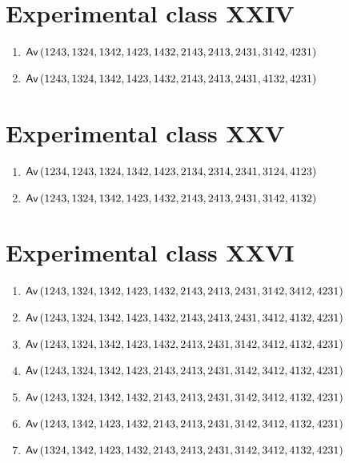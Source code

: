 \section{Experimental class XXIV}
\begin{enumerate}
\item $\textsf{Av}\left(1243,1324,1342,1423,1432,2143,2413,2431,3142,4231\right)$
\item $\textsf{Av}\left(1243,1324,1342,1423,1432,2143,2413,2431,4132,4231\right)$
\end{enumerate}

\section{Experimental class XXV}
\begin{enumerate}
\item $\textsf{Av}\left(1234,1243,1324,1342,1423,2134,2314,2341,3124,4123\right)$
\item $\textsf{Av}\left(1243,1324,1342,1423,1432,2143,2413,2431,3142,4132\right)$
\end{enumerate}

\section{Experimental class XXVI}
\begin{enumerate}
\item $\textsf{Av}\left(1243,1324,1342,1423,1432,2143,2413,2431,3142,3412,4231\right)$
\item $\textsf{Av}\left(1243,1324,1342,1423,1432,2143,2413,2431,3412,4132,4231\right)$
\item $\textsf{Av}\left(1243,1324,1342,1423,1432,2413,2431,3142,3412,4132,4231\right)$
\item $\textsf{Av}\left(1243,1324,1342,1423,2143,2413,2431,3142,3412,4132,4231\right)$
\item $\textsf{Av}\left(1243,1324,1342,1432,2143,2413,2431,3142,3412,4132,4231\right)$
\item $\textsf{Av}\left(1243,1342,1423,1432,2143,2413,2431,3142,3412,4132,4231\right)$
\item $\textsf{Av}\left(1324,1342,1423,1432,2143,2413,2431,3142,3412,4132,4231\right)$
\end{enumerate}